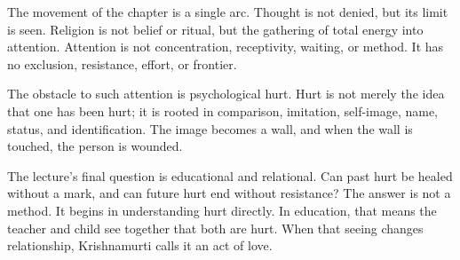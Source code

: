 The movement of the chapter is a single arc. Thought is not denied, but its limit is seen. Religion is not belief or ritual, but the gathering of total energy into attention. Attention is not concentration, receptivity, waiting, or method. It has no exclusion, resistance, effort, or frontier.

The obstacle to such attention is psychological hurt. Hurt is not merely the idea that one has been hurt; it is rooted in comparison, imitation, self-image, name, status, and identification. The image becomes a wall, and when the wall is touched, the person is wounded.

The lecture's final question is educational and relational. Can past hurt be healed without a mark, and can future hurt end without resistance? The answer is not a method. It begins in understanding hurt directly. In education, that means the teacher and child see together that both are hurt. When that seeing changes relationship, Krishnamurti calls it an act of love.